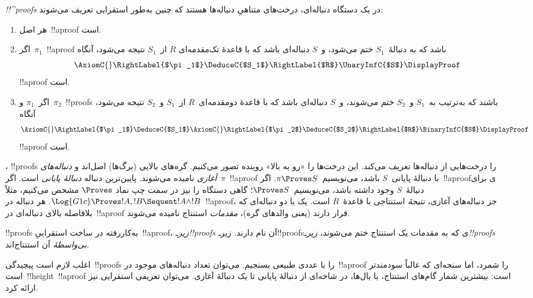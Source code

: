 \documentclass[../../../include/open-logic-section]{subfiles}
\begin{document}
\begin{defn}
\emph{!!^{proof}s} در یک دستگاه دنباله‌ای، درخت‌های متناهیِ دنباله‌ها
هستند که چنین به‌طور استقرایی تعریف می‌شوند:
\begin{enumerate}
  \item{} هر اصل~!!a{proof} است.
  \item{} اگر~$\pi_1$~!!a{proof} باشد که به
  دنبالهٔ~$S_1$ ختم می‌شود، و~$S$ دنباله‌ای باشد که با قاعدهٔ تک‌مقدمه‌ای
  $R$ از~$S_1$ نتیجه می‌شود، آنگاه
  \[
  \AxiomC{}
  \RightLabel{$\pi_1$}
  \DeduceC{$S_1$}
  \RightLabel{$R$}
  \UnaryInfC{$S$}
  \DisplayProof
  \]
  !!a{proof} است.
  \item{} اگر~$\pi_1$ و~$\pi_2$~!!{proof}s
  باشند که به‌ترتیب به~$S_1$ و~$S_2$ ختم می‌شوند، و~$S$ دنباله‌ای باشد
  که با قاعدهٔ دومقدمه‌ای~$R$ از~$S_1$ و~$S_2$ نتیجه می‌شود، آنگاه
  \[
  \AxiomC{}
  \RightLabel{$\pi_1$}
  \DeduceC{$S_1$}
  \AxiomC{}
  \RightLabel{$\pi_2$}
  \DeduceC{$S_2$}
  \RightLabel{$R$}
  \BinaryInfC{$S$}
  \DisplayProof
  \]
  !!a{proof} است.
\end{enumerate}
\end{defn}

، !!{proof}s را درخت‌هایی از دنباله‌ها تعریف می‌کند.
این درخت‌ها را «رو به بالا» روینده تصور می‌کنیم. گره‌های بالایی (برگ‌ها)
اصل‌اند و \emph{دنباله‌های آغازی} نامیده می‌شوند. پایین‌ترین دنباله
\emph{دنبالهٔ پایانی} است. اگر~$\pi$~!!a{proof} با دنبالهٔ پایانی~$S$
باشد، می‌نویسیم~$\pi\Proves S$. اگر~!!a{proof}ی برای دنبالهٔ~$S$ وجود
داشته باشد، می‌نویسیم~$\Proves S$؛ گاهی دستگاه را نیز در سمت چپ نماد
$\Proves$ مشخص می‌کنیم، مثلاً
$\Log{G1c}\Proves !A,!B\Sequent !A\land !B$. هر دنباله در~!!a{proof}،
جز دنباله‌های آغازی، \emph{نتیجهٔ} استنتاجی با قاعدهٔ~$R$ است. یک یا دو
دنباله‌ای که بلافاصله بالای دنباله‌ای در~!!a{proof} قرار دارند (یعنی
والدهای گره)، \emph{مقدمات} استنتاج نامیده می‌شوند.

!!{proof}s به‌کاررفته در ساخت استقراییِ~!!a{proof}،
\emph{زیرـ!!{proof}s} آن نام دارند. زیرـ!!{proof}sی که به مقدمات یک
استنتاج ختم می‌شوند، \emph{زیرـ!!{proof}s بی‌واسطهٔ} آن استنتاج‌اند.

اغلب لازم است پیچیدگی~!!{proof}s را با عددی طبیعی بسنجیم. می‌توان تعداد
دنباله‌های موجود در~!!a{proof} را شمرد، اما سنجه‌ای که غالباً سودمندتر
است~!!{height}~!!a{proof} است: بیشترین شمار گام‌های استنتاج، یا یال‌ها،
در شاخه‌ای از دنبالهٔ پایانی تا یک دنبالهٔ آغازی. می‌توان تعریفی استقرایی
نیز ارائه کرد.
\end{document}
